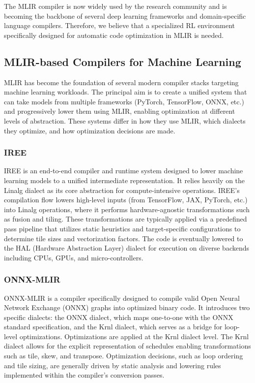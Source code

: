 \documentclass[10pt,twocolumn]{article}
\begin{document}
The MLIR compiler is now widely used by the research community and is becoming the backbone of several deep learning frameworks and domain-specific language compilers. Therefore, we believe that a specialized RL environment specifically designed for automatic code optimization in MLIR is needed.

\subsection{MLIR-based Compilers for Machine Learning}

MLIR has become the foundation of several modern compiler stacks targeting machine learning workloads. The principal aim is to create a unified system that can take models from multiple frameworks (PyTorch, TensorFlow, ONNX, etc.) and progressively lower them using MLIR, enabling optimization at different levels of abstraction. These systems differ in how they use MLIR, which dialects they optimize, and how optimization decisions are made.

\subsubsection{IREE}
IREE \cite{ref49} is an end-to-end compiler and runtime system designed to lower machine learning models to a unified intermediate representation. It relies heavily on the Linalg dialect as its core abstraction for compute-intensive operations. IREE's compilation flow lowers high-level inputs (from TensorFlow, JAX, PyTorch, etc.) into Linalg operations, where it performs hardware-agnostic transformations such as fusion and tiling. These transformations are typically applied via a predefined pass pipeline that utilizes static heuristics and target-specific configurations to determine tile sizes and vectorization factors. The code is eventually lowered to the HAL (Hardware Abstraction Layer) dialect for execution on diverse backends including CPUs, GPUs, and micro-controllers.

\subsubsection{ONNX-MLIR}
ONNX-MLIR \cite{ref50} is a compiler specifically designed to compile valid Open Neural Network Exchange (ONNX) graphs into optimized binary code. It introduces two specific dialects: the ONNX dialect, which maps one-to-one with the ONNX standard specification, and the Krnl dialect, which serves as a bridge for loop-level optimizations. Optimizations are applied at the Krnl dialect level. The Krnl dialect allows for the explicit representation of schedules enabling transformations such as tile, skew, and transpose. Optimization decisions, such as loop ordering and tile sizing, are generally driven by static analysis and lowering rules implemented within the compiler's conversion passes.
\end{document}
